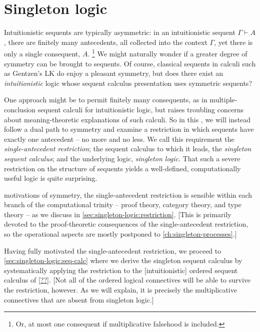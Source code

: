 \chapter{Singleton logic}\label{ch:singleton-logic}

Intuitionistic sequents are typically asymmetric:
in an intuitionistic sequent $\Gamma \vdash A$, there are finitely many antecedents, all collected into the context $\Gamma$, yet there is only a single consequent, $A$.%
\footnote{Or, at most one consequent if multiplicative falsehood is included.}
We might naturally wonder if a greater degree of symmetry can be brought to sequents.
Of course, classical sequents in calculi such as Gentzen's LK\autocite{Gentzen:??} do enjoy a pleasant symmetry, but does there exist an \emph{intuitionistic} logic whose sequent calculus presentation uses symmetric sequents?

One approach might be to permit finitely many consequents, as in multiple-conclusion sequent calculi for intuitionistic logic\autocite{??}, but \citeauthor{Steinberger:JPL11}\autocite{Steinberger:JPL11} raises troubling concerns about meaning-theoretic explanations of such calculi.
So in this , we will instead follow a dual path to symmetry and examine a restriction in which sequents have exactly one antecedent -- no more and no less.
We call this requirement the \emph{single-antecedent restriction}; the sequent calculus to which it leads, the \emph{singleton sequent calculus}; and the underlying logic, \emph{singleton logic}.
That such a severe restriction on the structure of sequents yields a well-defined, computationally useful logic is quite surprising.

 motivations of symmetry, the single-antecedent restriction is sensible within each branch of the computational trinity\autocite{Harper:??} -- proof theory, category theory, and type theory -- as we discuss in \cref{sec:singleton-logic:restriction}.
[This  is primarily devoted to the proof-theoretic consequences of the single-antecedent restriction, so the operational aspects are mostly postponed to \cref{ch:singleton-processes}.]

Having fully motivated the single-antecedent restriction, we proceed to \cref{sec:singleton-logic:seq-calc} where we derive the singleton sequent calculus by systematically applying the restriction to the [intuitionistic] ordered sequent calculus of \cref{??}.
[Not all of the ordered logical connectives will be able to survive the restriction, however.
As we will explain, it is precisely the multiplicative connectives that are absent from singleton logic.]



